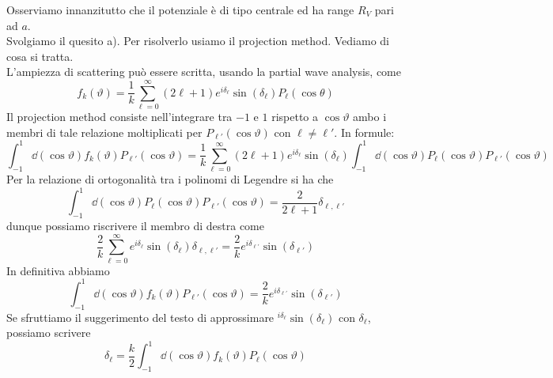 \begin{soluzione}
   Osserviamo innanzitutto che il potenziale è di tipo centrale ed ha range $R_V$ pari ad $a$.\\
   Svolgiamo il quesito a). Per risolverlo usiamo il projection method. Vediamo di cosa si tratta.\\
   L'ampiezza di scattering può essere scritta, usando la partial wave analysis, come
   \begin{equation*}
      f_k(\vartheta)
      =\frac{1}{k} \sum_{\ell=0}^{\infty} (2\ell + 1) e^{i \delta_{\ell}} \sin{(\delta_{\ell})} P_{\ell}(\cos{\theta})
   \end{equation*}
   Il projection method consiste nell'integrare tra $-1$ e $1$ rispetto a $\cos{\vartheta}$ ambo i membri di tale relazione moltiplicati per $P_{\ell'}(\cos{\vartheta})$ con $\ell \neq \ell'$. In formule:
   \begin{equation*}
      \int_{-1}^{1} \dd{(\cos{\vartheta})} f_k(\vartheta) P_{\ell'}(\cos{\vartheta})
      =\frac{1}{k} \sum_{\ell=0}^{\infty} (2\ell + 1) e^{i \delta_{\ell}} \sin{(\delta_{\ell})} \int_{-1}^{1} \dd{(\cos{\vartheta})} P_{\ell}(\cos{\vartheta}) P_{\ell'}(\cos{\vartheta})
   \end{equation*}
   Per la relazione di ortogonalità tra i polinomi di Legendre si ha che
   \begin{equation*}
      \int_{-1}^{1} \dd{(\cos{\vartheta})} P_{\ell}(\cos{\vartheta}) P_{\ell'}(\cos{\vartheta})
      =\frac{2}{2\ell + 1} \delta_{\ell,\ell'}
   \end{equation*}
   dunque possiamo riscrivere il membro di destra come
   \begin{equation*}
      \frac{2}{k} \sum_{\ell=0}^{\infty} e^{i \delta_{\ell}} \sin{(\delta_{\ell})} \delta_{\ell,\ell'}
      =\frac{2}{k} e^{i \delta_{\ell'}} \sin{(\delta_{\ell'})}
   \end{equation*}
   In definitiva abbiamo
   \begin{equation*}
      \int_{-1}^{1} \dd{(\cos{\vartheta})} f_k(\vartheta) P_{\ell'}(\cos{\vartheta})
      =\frac{2}{k} e^{i \delta_{\ell'}} \sin{(\delta_{\ell'})}
   \end{equation*}
   Se sfruttiamo il suggerimento del testo di approssimare $^{i \delta_{\ell}} \sin{(\delta_{\ell})}$ con $\delta_{\ell}$, possiamo scrivere
   \begin{equation}
      \delta_{\ell}
      =\frac{k}{2} \int_{-1}^{1} \dd{(\cos{\vartheta})} f_k(\vartheta) P_{\ell}(\cos{\vartheta})
      \label{eq:delta_ell_metodo_proiezione}

\end{equation}
\end{soluzione}
